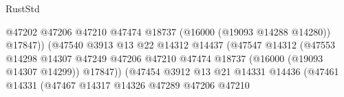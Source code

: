 \begin{lexlean}{RustStd}
\begin{coremodule}
                                                          @47202
                                                          @47206
                                                          @47210
                                                          @47474
                                                          @18737
                                                          (@16000 (@19093 @14288 @14280))
                                                          @17847))
                                                      (@47540
                                                        @3913
                                                        @13
                                                        @22
                                                        @14312
                                                        @14437
                                                        (@47547
                                                          @14312
                                                          (@47553
                                                            @14298
                                                            @14307
                                                            @47249
                                                            @47206
                                                            @47210
                                                            @47474
                                                            @18737
                                                            (@16000 (@19093 @14307 @14299))
                                                            @17847))
                                                        (@47454
                                                          @3912
                                                          @13
                                                          @21
                                                          @14331
                                                          @14436
                                                          (@47461
                                                            @14331
                                                            (@47467
                                                              @14317
                                                              @14326
                                                              @47289
                                                              @47206
                                                              @47210

\end{coremodule}
\end{lexlean}

